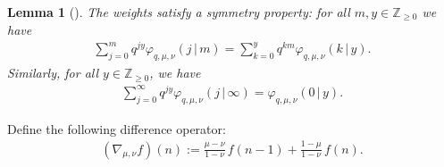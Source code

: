 \documentclass[11pt]{article}
\numberwithin{equation}{section}
\numberwithin{equation}{section}
\newtheorem{Lemma}[Theorem]{Lemma}
\begin{document}
\begin{Lemma}[\cite{Barraquand_qhahn_2014, Corwin2014qmunu}]
	\label{lemma:phi_symmetry}
	The weights satisfy a symmetry property: for all
	$m,y\in \mathbb{Z}_{\ge0}$ we have
	\begin{gather*}
		\sum_{j=0}^{m}q^{jy}\varphi_{q,\mu,\nu}(j\,|\, m)
		=\sum_{k=0}^{y} q^{km}\varphi_{q,\mu,\nu}(k\,|\, y).
	\end{gather*}
	Similarly, for all $y\in \mathbb{Z}_{\ge0}$, we have
	\begin{gather*}
		\sum_{j=0}^{\infty}q^{jy}\varphi_{q,\mu,\nu}(j\,|\, \infty)=
		\varphi_{q,\mu,\nu}(0\,|\, y).
	\end{gather*}
\end{Lemma}

Define the following difference operator:
\begin{gather}
	\label{eq:nabla_mu_nu}
	(\nabla_{\mu,\nu}f)(n):=\frac{\mu-\nu}{1-\nu}\,f(n-1)+\frac{1-\mu}{1-\nu}\,f(n).
\end{gather}
\end{document}
